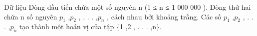 Dữ liệu
Dòng đầu tiến chứa một số nguyên n (1 ≤ n ≤ 1 000 000 ). Dòng thứ hai chứa n số nguyên $p_{1}$   ,$p_{2}$   , . . . ,$p_{n}$   , cách nhau bởi khoảng trắng. Các số $p_{1}$   ,$p_{2}$   , . . . ,$p_{n}$   tạo thành một hoán vị của tập \{1 ,2 , . . . ,n\}.